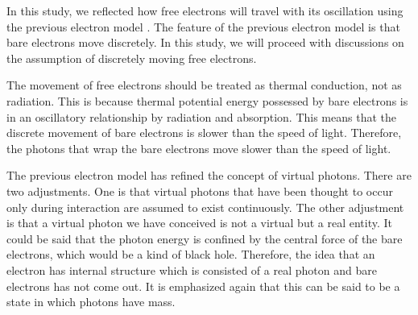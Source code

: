 \documentclass[reprint,amsmath,amssymb,aps,]{revtex4-1}
\numberwithin{equation}{section}%
\begin{document}
    In this study, we reflected how free electrons will travel with its oscillation using the previous electron model \cite{Hanamura1}. The feature of the previous electron model is that bare electrons move discretely. In this study, we will proceed with discussions on the assumption of discretely moving free electrons.

    The movement of free electrons should be treated as thermal conduction, not as radiation. This is because thermal potential energy possessed by bare electrons is in an oscillatory relationship by radiation and absorption. This means that the discrete movement of bare electrons is slower than the speed of light. Therefore, the photons that wrap the bare electrons move slower than the speed of light.

    
    The previous electron model has refined the concept of virtual photons. There are two adjustments. One is that virtual photons that have been thought to occur only during interaction are assumed to exist continuously. The other adjustment is that a virtual photon we have conceived is not a virtual but a real entity. It could be said that the photon energy is confined by the central force of the bare electrons, which would be a kind of black hole. Therefore, the idea that an electron has internal structure which is consisted of a real photon and bare electrons has not come out. It is emphasized again that this can be said to be a state in which photons have mass.
\end{document}
